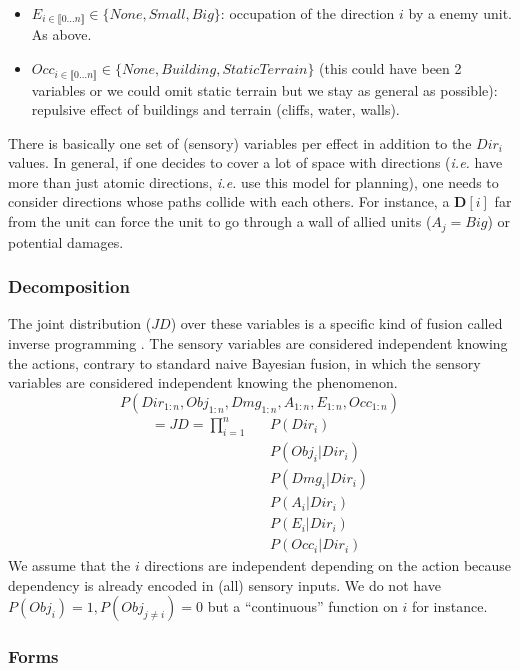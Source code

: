 \begin{itemize}
\item $E_{i \in \llbracket 0 \dots n\rrbracket } \in \{None, Small, Big\}$: occupation of the direction $i$ by a enemy unit. As above.
\item $Occ_{i \in \llbracket 0 \dots n\rrbracket } \in \{None, Building, StaticTerrain\}$ (this could have been 2 variables or we could omit static terrain but we stay as general as possible): repulsive effect of buildings and terrain (cliffs, water, walls).
\end{itemize}
There is basically one set of (sensory) variables per effect in addition to the $Dir_i$ values. 
In general, if one decides to cover a lot of space with directions (\textit{i.e.} have more than just atomic directions, \textit{i.e.} use this model for planning), one needs to consider directions whose paths collide with each others. For instance, a $\mathbf{D}[i]$ far from the unit can force the unit to go through a wall of allied units ($A_j = Big$) or potential damages.

\subsubsection{Decomposition}

The joint distribution ($JD$) over these variables is a specific kind of fusion called inverse programming \citep{LeHy04}. The sensory variables are considered independent knowing the actions, contrary to standard naive Bayesian fusion, in which the sensory variables are considered independent knowing the phenomenon.
$$P(Dir_{1:n}, Obj_{1:n}, Dmg_{1:n}, A_{1:n}, E_{1:n}, Occ_{1:n})$$
\begin{eqnarray*}
= JD = \prod_{i=1}^{n}&& P(Dir_i) \\
                    && P(Obj_i | Dir_i) \\
                    && P(Dmg_i | Dir_i) \\
                    && P(A_i | Dir_i) \\
                    && P(E_i | Dir_i) \\
                    && P(Occ_i | Dir_i)
\end{eqnarray*}
We assume that the $i$ directions are independent depending on the action because dependency is already encoded in (all) sensory inputs. We do not have $P(Obj_i) = 1, P(Obj_{j\neq i}) = 0$ but a ``continuous'' function on $i$ for instance.

\subsubsection{Forms}

